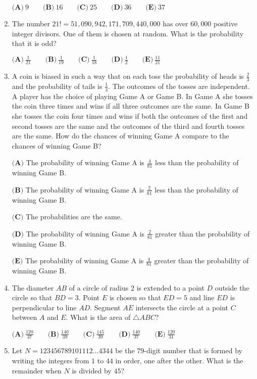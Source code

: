 \documentclass{article}
\begin{document}
\begin{enumerate}[label=\arabic*., itemsep=0.5em]
\(\textbf{(A)}\ 9\qquad\textbf{(B)}\ 16\qquad\textbf{(C)}\ 25\qquad\textbf{(D)}\ 36\qquad\textbf{(E)}\ 37\)\par \vspace{0.5em}\item The number \(21!=51,090,942,171,709,440,000\) has over \(60,000\) positive integer divisors. One of them is chosen at random. What is the probability that it is odd?

\(\textbf{(A)}\ \frac{1}{21} \qquad \textbf{(B)}\ \frac{1}{19} \qquad \textbf{(C)}\ \frac{1}{18} \qquad \textbf{(D)}\ \frac{1}{2} \qquad \textbf{(E)}\ \frac{11}{21}\)\par \vspace{0.5em}\item A coin is biased in such a way that on each toss the probability of heads is \(\frac{2}{3}\) and the probability of tails is \(\frac{1}{3}\). The outcomes of the tosses are independent. A player has the choice of playing Game A or Game B. In Game A she tosses the coin three times and wins if all three outcomes are the same. In Game B she tosses the coin four times and wins if both the outcomes of the first and second tosses are the same and the outcomes of the third and fourth tosses are the same. How do the chances of winning Game A compare to the chances of winning Game B?

\(\textbf{(A)}\) The probability of winning Game A is \(\frac{4}{81}\) less than the probability of winning Game B.

\(\textbf{(B)}\) The probability of winning Game A is \(\frac{2}{81}\) less than the probability of winning Game B.

\(\textbf{(C)}\) The probabilities are the same.

\(\textbf{(D)}\) The probability of winning Game A is \(\frac{2}{81}\) greater than the probability of winning Game B.

\(\textbf{(E)}\) The probability of winning Game A is \(\frac{4}{81}\) greater than the probability of winning Game B.\par \vspace{0.5em}\item The diameter \(AB\) of a circle of radius \(2\) is extended to a point \(D\) outside the circle so that \(BD=3\). Point \(E\) is chosen so that \(ED=5\) and line \(ED\) is perpendicular to line \(AD\). Segment \(AE\) intersects the circle at a point \(C\) between \(A\) and \(E\). What is the area of \(\triangle 
ABC\)?

\(\textbf{(A)}\ \frac{120}{37}\qquad\textbf{(B)}\ \frac{140}{39}\qquad\textbf{(C)}\ \frac{145}{39}\qquad\textbf{(D)}\ \frac{140}{37}\qquad\textbf{(E)}\ \frac{120}{31}\)\par \vspace{0.5em}\item Let \(N=123456789101112\dots4344\) be the \(79\)-digit number that is formed by writing the integers from \(1\) to \(44\) in order, one after the other. What is the remainder when \(N\) is divided by \(45\)?


\end{enumerate}
\end{document}
